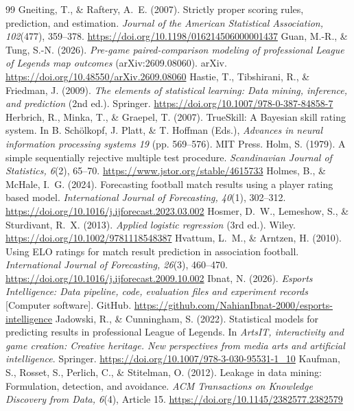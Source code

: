 \documentclass[12pt,a4paper]{article}
\begin{document}
\begin{thebibliography}{99}
 Gneiting, T., \& Raftery, A.~E. (2007). Strictly proper scoring rules, prediction, and estimation. \emph{Journal of the American Statistical Association, 102}(477), 359--378. \url{https://doi.org/10.1198/016214506000001437}
 Guan, M.-R., \& Tung, S.-N. (2026). \emph{Pre-game paired-comparison modeling of professional League of Legends map outcomes} (arXiv:2609.08060). arXiv. \url{https://doi.org/10.48550/arXiv.2609.08060}
 Hastie, T., Tibshirani, R., \& Friedman, J. (2009). \emph{The elements of statistical learning: Data mining, inference, and prediction} (2nd ed.). Springer. \url{https://doi.org/10.1007/978-0-387-84858-7}
 Herbrich, R., Minka, T., \& Graepel, T. (2007). TrueSkill: A Bayesian skill rating system. In B. Sch\"olkopf, J. Platt, \& T. Hoffman (Eds.), \emph{Advances in neural information processing systems 19} (pp. 569--576). MIT Press.
 Holm, S. (1979). A simple sequentially rejective multiple test procedure. \emph{Scandinavian Journal of Statistics, 6}(2), 65--70. \url{https://www.jstor.org/stable/4615733}
 Holmes, B., \& McHale, I.~G. (2024). Forecasting football match results using a player rating based model. \emph{International Journal of Forecasting, 40}(1), 302--312. \url{https://doi.org/10.1016/j.ijforecast.2023.03.002}
 Hosmer, D.~W., Lemeshow, S., \& Sturdivant, R.~X. (2013). \emph{Applied logistic regression} (3rd ed.). Wiley. \url{https://doi.org/10.1002/9781118548387}
 Hvattum, L.~M., \& Arntzen, H. (2010). Using ELO ratings for match result prediction in association football. \emph{International Journal of Forecasting, 26}(3), 460--470. \url{https://doi.org/10.1016/j.ijforecast.2009.10.002}
 Ibnat, N. (2026). \emph{Esports Intelligence: Data pipeline, code, evaluation files and experiment records} [Computer software]. GitHub. \url{https://github.com/NahianIbnat-2000/esports-intelligence}
 Jadowski, R., \& Cunningham, S. (2022). Statistical models for predicting results in professional League of Legends. In \emph{ArtsIT, interactivity and game creation: Creative heritage. New perspectives from media arts and artificial intelligence}. Springer. \url{https://doi.org/10.1007/978-3-030-95531-1_10}
 Kaufman, S., Rosset, S., Perlich, C., \& Stitelman, O. (2012). Leakage in data mining: Formulation, detection, and avoidance. \emph{ACM Transactions on Knowledge Discovery from Data, 6}(4), Article 15. \url{https://doi.org/10.1145/2382577.2382579}

\end{thebibliography}
\end{document}
